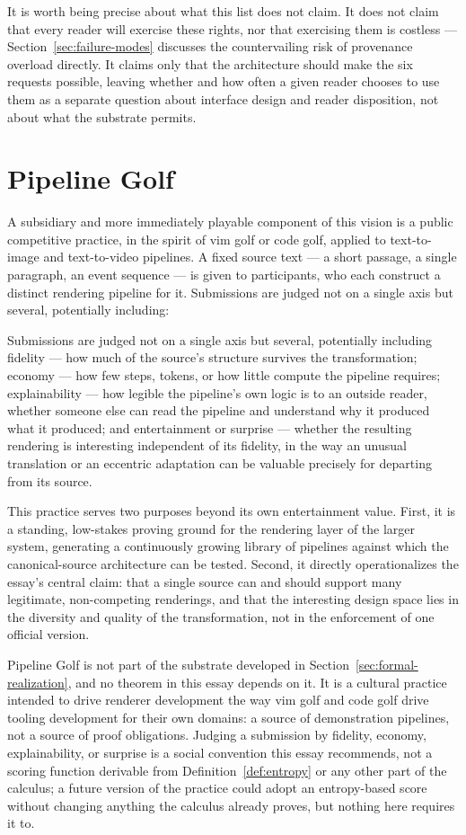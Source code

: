 \documentclass[11pt]{article}
\theoremstyle{definition}
\begin{document}
It is worth being precise about what this list does not claim. It does not claim that every reader will exercise these rights, nor that exercising them is costless --- Section~\ref{sec:failure-modes} discusses the countervailing risk of provenance overload directly. It claims only that the architecture should make the six requests possible, leaving whether and how often a given reader chooses to use them as a separate question about interface design and reader disposition, not about what the substrate permits.

\section{Pipeline Golf}
\label{sec:pipeline-golf}

A subsidiary and more immediately playable component of this vision is a public competitive practice, in the spirit of vim golf or code golf, applied to text-to-image and text-to-video pipelines. A fixed source text --- a short passage, a single paragraph, an event sequence --- is given to participants, who each construct a distinct rendering pipeline for it. Submissions are judged not on a single axis but several, potentially including:

Submissions are judged not on a single axis but several, potentially including fidelity --- how much of the source's structure survives the transformation; economy --- how few steps, tokens, or how little compute the pipeline requires; explainability --- how legible the pipeline's own logic is to an outside reader, whether someone else can read the pipeline and understand why it produced what it produced; and entertainment or surprise --- whether the resulting rendering is interesting independent of its fidelity, in the way an unusual translation or an eccentric adaptation can be valuable precisely for departing from its source.

This practice serves two purposes beyond its own entertainment value. First, it is a standing, low-stakes proving ground for the rendering layer of the larger system, generating a continuously growing library of pipelines against which the canonical-source architecture can be tested. Second, it directly operationalizes the essay's central claim: that a single source can and should support many legitimate, non-competing renderings, and that the interesting design space lies in the diversity and quality of the transformation, not in the enforcement of one official version.

Pipeline Golf is not part of the substrate developed in Section~\ref{sec:formal-realization}, and no theorem in this essay depends on it. It is a cultural practice intended to drive renderer development the way vim golf and code golf drive tooling development for their own domains: a source of demonstration pipelines, not a source of proof obligations. Judging a submission by fidelity, economy, explainability, or surprise is a social convention this essay recommends, not a scoring function derivable from Definition~\ref{def:entropy} or any other part of the calculus; a future version of the practice could adopt an entropy-based score without changing anything the calculus already proves, but nothing here requires it to.
\end{document}
